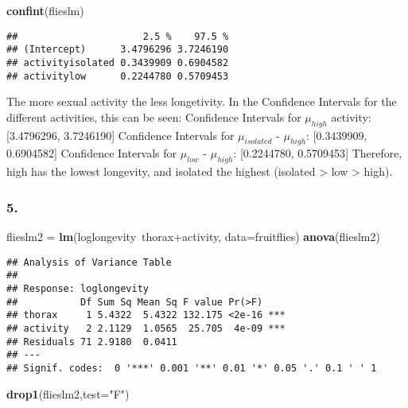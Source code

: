 \documentclass[11pt,]{article}
\newenvironment{Shaded}{\begin{snugshade}}{\end{snugshade}}
\newcommand{\KeywordTok}[1]{\textcolor[rgb]{0.13,0.29,0.53}{\textbf{{#1}}}}
\newcommand{\DataTypeTok}[1]{\textcolor[rgb]{0.13,0.29,0.53}{{#1}}}
\newcommand{\StringTok}[1]{\textcolor[rgb]{0.31,0.60,0.02}{{#1}}}
\newcommand{\NormalTok}[1]{{#1}}
\begin{document}
\begin{Shaded}
\begin{Highlighting}[]
\KeywordTok{confint}\NormalTok{(flieslm)}
\end{Highlighting}
\end{Shaded}

\begin{verbatim}
##                      2.5 %    97.5 %
## (Intercept)      3.4796296 3.7246190
## activityisolated 0.3439909 0.6904582
## activitylow      0.2244780 0.5709453
\end{verbatim}

The more sexual activity the less longetivity. In the Confidence
Intervals for the different activities, this can be seen: Confidence
Intervals for \(\mu_{high}\) activity: {[}3.4796296, 3.7246190{]}
Confidence Intervals for \(\mu_{isolated}\) - \(\mu_{high}\):
{[}0.3439909, 0.6904582{]} Confidence Intervals for \(\mu_{low}\) -
\(\mu_{high}\): {[}0.2244780, 0.5709453{]} Therefore, high has the
lowest longevity, and isolated the highest (isolated \textgreater{} low
\textgreater{} high).

\subsubsection{5.}\label{section-3}

\begin{Shaded}
\begin{Highlighting}[]
\NormalTok{flieslm2 =}\StringTok{ }\KeywordTok{lm}\NormalTok{(loglongevity~thorax+activity, }\DataTypeTok{data=}\NormalTok{fruitflies)}
\KeywordTok{anova}\NormalTok{(flieslm2)}
\end{Highlighting}
\end{Shaded}

\begin{verbatim}
## Analysis of Variance Table
## 
## Response: loglongevity
##           Df Sum Sq Mean Sq F value Pr(>F)    
## thorax     1 5.4322  5.4322 132.175 <2e-16 ***
## activity   2 2.1129  1.0565  25.705  4e-09 ***
## Residuals 71 2.9180  0.0411                   
## ---
## Signif. codes:  0 '***' 0.001 '**' 0.01 '*' 0.05 '.' 0.1 ' ' 1
\end{verbatim}

\begin{Shaded}
\begin{Highlighting}[]
\KeywordTok{drop1}\NormalTok{(flieslm2,}\DataTypeTok{test=}\StringTok{"F"}\NormalTok{)}
\end{Highlighting}
\end{Shaded}
\end{document}
